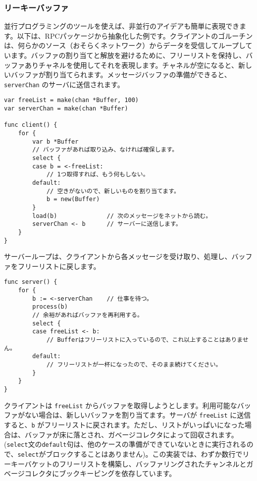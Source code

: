 \documentclass{jsarticle}
\begin{document}
\subsubsection{リーキーバッファ}

並行プログラミングのツールを使えば、非並行のアイデアも簡単に表現できます。以下は、RPCパッケージから抽象化した例です。クライアントのゴルーチンは、何らかのソース（おそらくネットワーク）からデータを受信してループしています。バッファの割り当てと解放を避けるために、フリーリストを保持し、バッファありチャネルを使用してそれを表現します。チャネルが空になると、新しいバッファが割り当てられます。メッセージバッファの準備ができると、\texttt{serverChan}
のサーバに送信されます。

\begin{lstlisting}[numbers=none]
var freeList = make(chan *Buffer, 100)
var serverChan = make(chan *Buffer)

func client() {
    for {
        var b *Buffer
        // バッファがあれば取り込み、なければ確保します。
        select {
        case b = <-freeList:
            // 1つ取得すれば、もう何もしない。
        default:
            // 空きがないので、新しいものを割り当てます。
            b = new(Buffer)
        }
        load(b)              // 次のメッセージをネットから読む。
        serverChan <- b      // サーバーに送信します。
    }
}
\end{lstlisting}

サーバーループは、クライアントから各メッセージを受け取り、処理し、バッファをフリーリストに戻します。

\begin{lstlisting}[numbers=none]
func server() {
    for {
        b := <-serverChan    // 仕事を待つ。
        process(b)
        // 余裕があればバッファを再利用する。
        select {
        case freeList <- b:
            // Bufferはフリーリストに入っているので、これ以上することはありません。
        default:
            // フリーリストが一杯になったので、そのまま続けてください。
        }
    }
}
\end{lstlisting}

クライアントは \texttt{freeList}
からバッファを取得しようとします。利用可能なバッファがない場合は、新しいバッファを割り当てます。サーバが
\texttt{freeList} に送信すると、\texttt{b}
がフリーリストに戻されます。ただし、リストがいっぱいになった場合は、バッファが床に落とされ、ガベージコレクタによって回収されます。(\texttt{select}文の\texttt{default}句は、他のケースの準備ができていないときに実行されるので、\texttt{select}がブロックすることはありません)。この実装では、わずか数行でリーキーバケットのフリーリストを構築し、バッファリングされたチャンネルとガベージコレクタにブックキーピングを依存しています。
\end{document}
